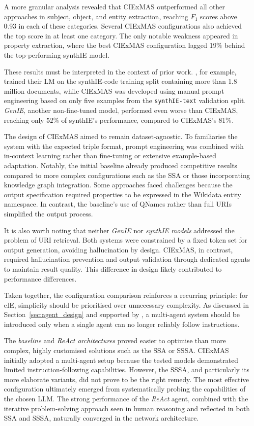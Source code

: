 \documentclass[a4paper,oneside,bibliography=totoc]{scrbook}
\begin{document}
A more granular analysis revealed that CIExMAS outperformed all other approaches in subject, object, and entity extraction, reaching $F_{1}$ scores above 0.93 in each of these categories. Several CIExMAS configurations also achieved the top score in at least one category. The only notable weakness appeared in property extraction, where the best CIExMAS configuration lagged 19\% behind the top-performing synthIE model.

These results must be interpreted in the context of prior work. \citet{Josifoski2023}, for example, trained their \ac{LM} on the synthIE-code training split containing more than 1.8 million documents, while CIExMAS was developed using manual prompt engineering based on only five examples from the \texttt{synthIE-text} validation split. \textit{GenIE}, another non-fine-tuned model, performed even worse than CIExMAS, reaching only 52\% of synthIE’s performance, compared to CIExMAS’s 81\%.

The design of CIExMAS aimed to remain dataset-agnostic. To familiarise the system with the expected triple format, prompt engineering was combined with in-context learning rather than fine-tuning or extensive example-based adaptation. Notably, the initial baseline already produced competitive results compared to more complex configurations such as the \ac{SSA} or those incorporating knowledge graph integration. Some approaches faced challenges because the output specification required properties to be expressed in the Wikidata entity namespace. In contrast, the baseline’s use of QNames rather than full URIs simplified the output process.

It is also worth noting that neither \textit{GenIE} nor \textit{synthIE models} addressed the problem of URI retrieval. Both systems were constrained by a fixed token set for output generation, avoiding hallucination by design. CIExMAS, in contrast, required hallucination prevention and output validation through dedicated agents to maintain result quality. This difference in design likely contributed to performance differences.

Taken together, the configuration comparison reinforces a recurring principle: for \ac{cIE}, simplicity should be prioritised over unnecessary complexity. As discussed in Section~\ref{sec:agent_design} and supported by \citet{Anthropic2024}, a multi-agent system should be introduced only when a single agent can no longer reliably follow instructions.

The \textit{baseline} and \textit{ReAct architectures} proved easier to optimise than more complex, highly customised solutions such as the \ac{SSA} or \ac{SSSA}. CIExMAS initially adopted a multi-agent setup because the tested models demonstrated limited instruction-following capabilities. However, the \ac{SSSA}, and particularly its more elaborate variants, did not prove to be the right remedy. The most effective configuration ultimately emerged from systematically probing the capabilities of the chosen \ac{LLM}. The strong performance of the \textit{ReAct} agent, combined with the iterative problem-solving approach seen in human reasoning and reflected in both \ac{SSA} and \ac{SSSA}, naturally converged in the network architecture.
\end{document}
